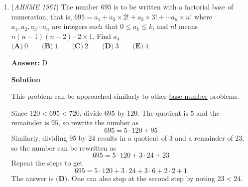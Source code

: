 \begin{enumerate}
 \textbf{Answer: }A



\textbf{Solution}

This problem is really finding the \href{https://artofproblemsolving.com/wiki/index.php?title=Range}{range} of a function with a restricted \href{https://artofproblemsolving.com/wiki/index.php?title=Domain\_(function)}{domain}.

 


 Dividing $x+2$ into $2x+3$ yields $2 - \frac{1}{x+2}$.  Since $x \ge 0$, as $x$ gets larger, $\frac{1}{x+2}$ approaches $0$, so $\frac{2x+3}{x+2}$ approaches $2$ as $x$ gets larger.  That means $M = 2$.  Since $\frac{1}{x+2}$ can never be $0$, $\frac{2x+3}{x+2}$ can never be $2$, so $M$ is not in the set $S$.

 


 For the smallest value, plug in $0$ in $\frac{2x+3}{x+2}$ to get $\frac{3}{2}$, so $m = \frac{3}{2}$.  Since plugging in $0$ results in $m$, $m$ is in the set $S$.

 


 Thus, the answer is $\boxed{\textbf{(A)}}$.

 


	\item (\textit{AHSME 1961}) The number $695$ is to be written with a factorial base of numeration, that is, $695=a_1+a_2\times2!+a_3\times3!+ \cdots a_n \times n!$ 
where $a_1, a_2, a_3 \cdots a_n$ are integers such that $0 \le a_k \le k$, and $n!$ means $n(n-1)(n-2)\cdots2 \times 1$. Find $a_4$
$\textbf{(A)}\ 0\qquad \textbf{(B)}\ 1\qquad \textbf{(C)}\ 2\qquad \textbf{(D)}\ 3\qquad \textbf{(E)}\ 4$

 \textbf{Answer: }D



\textbf{Solution}

This problem can be approached similarly to other \href{https://artofproblemsolving.com/wiki/index.php?title=Base\_number}{base number} problems.

 Since $120 < 695 < 720$, divide $695$ by $120$.  The quotient is $5$ and the remainder is $95$, so rewrite the number as
 \[695 = 5 \cdot 120 + 95\]Similarly, dividing $95$ by $24$ results in a quotient of $3$ and a remainder of $23$, so the number can be rewritten as
 \[695 = 5 \cdot 120 + 3 \cdot 24 + 23\]Repeat the steps to get
 \[695 = 5 \cdot 120 + 3 \cdot 24 + 3 \cdot 6 + 2 \cdot 2 + 1\]The answer is $\boxed{\textbf{(D)}}$.  One can also stop at the second step by noting $23 < 24$.


\end{enumerate}

